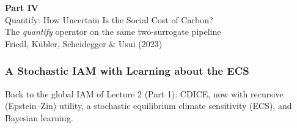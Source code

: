 \documentclass[aspectratio=169,11pt]{beamer}
\begin{document}
\begin{frame}{}
\vfill
\begin{center}
{\Huge \textcolor{uzhblue}{\textbf{Part IV}}}\\[12pt]
{\LARGE Quantify: How Uncertain Is the Social Cost of Carbon?}\\[8pt]
{\small The \emph{quantify} operator on the same two-surrogate pipeline\\
Friedl, K\"ubler, Scheidegger \& Usui (2023)}
\end{center}
\vfill
\end{frame}

\begin{frame}
\frametitle{A Stochastic IAM with Learning about the ECS}
\vspace{-0.2em}
{\scriptsize Back to the global IAM of Lecture 2 (Part 1): CDICE, now with recursive (Epstein--Zin) utility, a stochastic equilibrium climate sensitivity (ECS), and Bayesian learning.\par}
\vspace{-0.2em}
\begin{center}
\end{center}
\end{frame}
\end{document}
